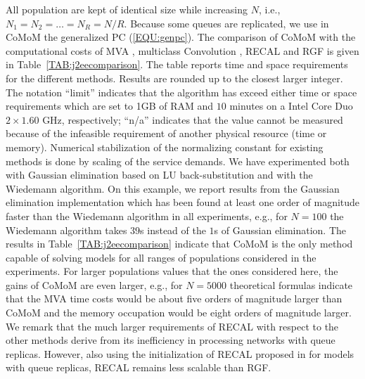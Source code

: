 \documentclass[journal,twocolumn,9.5pt]{IEEEtran}
\begin{document}
All population are kept of identical size while increasing $N$, i.e., $N_1=N_2=\ldots=N_{R}=N/R$. Because some queues are replicated, we use in CoMoM the generalized PC (\ref{EQU:genpc}). The comparison of CoMoM with the computational costs of MVA \cite{ReiL80}, multiclass Convolution \cite{ReiK75b}, RECAL \cite{ConG86} and RGF \cite{HarL04} is given in Table~\ref{TAB:j2eecomparison}. The table reports time and space requirements for the different methods. Results are rounded up to the closest larger integer. The notation ``limit'' indicates that the algorithm has exceed either time or space requirements which are set to 1GB of RAM and $10$ minutes on a Intel Core Duo $2\times 1.60$ GHz, respectively; ``n/a'' indicates that the value cannot be measured because of the infeasible requirement of another physical resource (time or memory). Numerical stabilization of the normalizing constant for existing methods is done by scaling of the service demands\cite{Lam82,ConG86}. We have experimented both with Gaussian elimination based on LU back-substitution and with the Wiedemann algorithm. On this example, we report results from the Gaussian elimination implementation which has been found at least one order of magnitude faster than the Wiedemann algorithm in all experiments, e.g., for $N=100$ the Wiedemann algorithm takes $39$s instead of the $1$s of Gaussian elimination. The results in Table~\ref{TAB:j2eecomparison} indicate that CoMoM is the only method capable of solving models for all ranges of populations considered in the experiments. For larger populations values that the ones considered here, the gains of CoMoM are even larger, e.g., for $N=5000$ theoretical formulas indicate that {the MVA time costs would be about five orders of magnitude larger than CoMoM and the memory occupation would be eight orders of magnitude larger}. We remark that the much larger requirements of RECAL with respect to the other methods derive from its inefficiency in processing networks with queue replicas\cite{HarL04}. However, also using the initialization of RECAL proposed in \cite{Cas06b} for models with queue replicas, RECAL remains less scalable than RGF.
\end{document}
